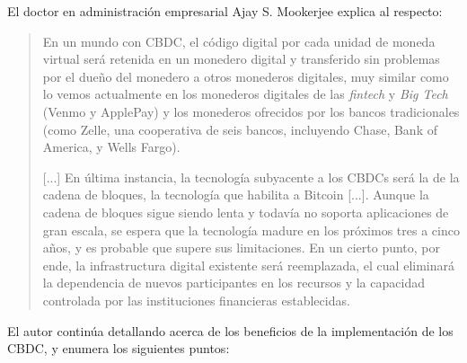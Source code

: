 \documentclass[12pt,a4paper,twoside]{book}
\begin{document}
El doctor en administración empresarial Ajay S. Mookerjee explica al respecto:

\begin{quotation}
En un mundo con CBDC, el código digital por cada unidad de moneda virtual será retenida en un monedero digital y transferido sin problemas por el dueño del monedero a otros monederos digitales, muy similar como lo vemos actualmente en los monederos digitales de las \textit{fintech} y \textit{Big Tech} (Venmo y ApplePay) y los monederos ofrecidos por los bancos tradicionales (como Zelle, una cooperativa de seis bancos, incluyendo Chase, Bank of America, y Wells Fargo).

[...] En última instancia, la tecnología subyacente a los CBDCs será la de la cadena de bloques, la tecnología que habilita a Bitcoin [...]. Aunque la cadena de bloques sigue siendo lenta y todavía no soporta aplicaciones de gran escala, se espera que la tecnología madure en los próximos tres a cinco años, y es probable que supere sus limitaciones. En un cierto punto, por ende, la infrastructura digital existente será reemplazada, el cual eliminará la dependencia de nuevos participantes en los recursos y la capacidad controlada por las instituciones financieras establecidas. \cite{CBDC}
\end{quotation}

El autor continúa detallando acerca de los beneficios de la implementación de los CBDC, y enumera los siguientes puntos:
\end{document}
